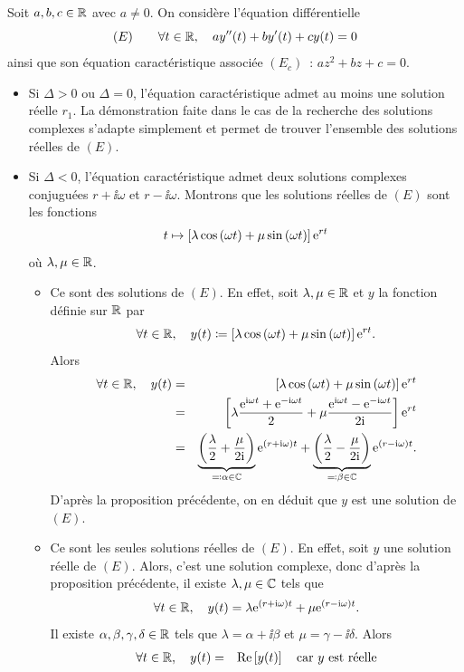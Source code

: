 \documentclass{magnoliaold}
\begin{document}
\begin{preuve}
\begin{francois}
Soit $a,b,c\in\mathbb{R}$ avec $a\neq 0$. On considère l'équation différentielle
\[(E)\qquad\forall t\in\mathbb{R} ,\quad a y''(t)+by'(t)+cy(t)=0\]
ainsi que son équation caractéristique associée $(E_c)$~: $az^2+bz+c=0$.
\begin{itemize}
\item Si $\Delta>0$ ou $\Delta=0$, l'équation caractéristique admet au moins une solution réelle $r_1$. La démonstration faite dans le cas de la recherche des solutions complexes s'adapte simplement et permet de trouver l'ensemble des solutions réelles de $(E)$.
\item Si $\Delta<0$, l'équation caractéristique admet deux solutions complexes conjuguées $r+\ii\omega$ et $r-\ii\omega$. Montrons que les solutions réelles de $(E)$ sont les fonctions
\[t\mapsto \left[\lambda\cos\left(\omega t\right)+\mu\sin\left(\omega t\right)\right]{\rm e}^{r t}\]
où $\lambda,\mu\in\mathbb{R}$.
\begin{itemize}
\item Ce sont des solutions de $(E)$. En effet, soit $\lambda,\mu\in\mathbb{R}$ et $y$ la fonction définie sur $\mathbb{R}$ par
\[\forall t\in\mathbb{R},\quad y(t)\coloneqq \left[\lambda\cos\left(\omega t\right)+\mu\sin\left(\omega t\right)\right]{\rm e}^{r t}.\]
Alors
\begin{eqnarray*}
\forall t\in\mathbb{R},\quad y(t)
&=& \left[\lambda\cos\left(\omega t\right)+\mu\sin\left(\omega t\right)\right]{\rm e}^{r t}\\
&=& \left[\lambda\frac{{\rm e}^{{\rm i}\omega t}+{\rm e}^{-{\rm i}\omega t}}{2}+\mu\frac{{\rm e}^{{\rm i}\omega t}-{\rm e}^{-{\rm i}\omega t}}{2{\rm i}}\right]{\rm e}^{r t}\\
&=& \underbrace{\left(\frac{\lambda}{2}+\frac{\mu}{2{\rm i}}\right)}_{\eqqcolon \alpha\in\mathbb{C}}{\rm e}^{(r+{\rm i}\omega)t}+\underbrace{\left(\frac{\lambda}{2}-\frac{\mu}{2{\rm i}}\right)}_{\eqqcolon \beta\in\mathbb{C}}{\rm e}^{(r-{\rm i}\omega)t}.
\end{eqnarray*}
D'après la proposition précédente, on en déduit que $y$ est une solution de $(E)$.
\item Ce sont les seules solutions réelles de $(E)$. En effet, soit $y$ une solution réelle de $(E)$. Alors, c'est une solution complexe, donc d'après la proposition précédente, il existe $\lambda,\mu\in\mathbb{C}$ tels que
\[\forall t\in\mathbb{R},\quad y(t)=\lambda{\rm e}^{(r+{\rm i}\omega)t}+\mu{\rm e}^{(r-{\rm i}\omega)t}.\]
Il existe $\alpha,\beta,\gamma,\delta\in\mathbb{R}$ tels que $\lambda=\alpha+\ii\beta$ et $\mu=\gamma-\ii\delta$. Alors
\begin{eqnarray*}
\forall t\in\R\qsep y(t)
&=& \Re\cro{y(t)}\quad\text{car $y$ est réelle}\\

\end{eqnarray*}
\end{itemize}
\end{itemize}
\end{francois}
\end{preuve}
\end{document}
